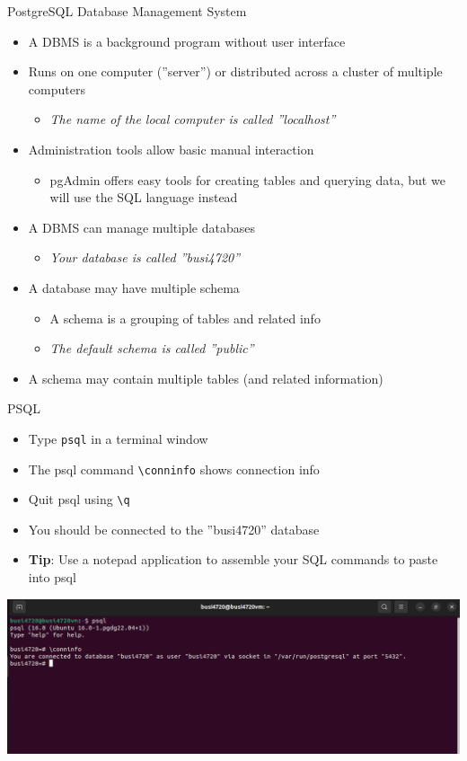 \documentclass[ignorenonframetext,xcolor=x11names]{beamer}
\begin{document}
\begin{frame}{PostgreSQL Database Management System}
\begin{itemize}
  \item A DBMS is a background program without user interface
  \item Runs on one computer (''server'') or distributed across a cluster of multiple computers
  \begin{itemize}
    \item \emph{The name of the local computer is called ''localhost''}
  \end{itemize}
  \item Administration tools allow basic manual interaction
  \begin{itemize}
    \item pgAdmin offers easy tools for creating tables and querying data, but we will use the SQL language instead
  \end{itemize}
  \item A DBMS can manage multiple databases
  \begin{itemize}
    \item \emph{Your database is called ''busi4720''}
  \end{itemize}
  \item A database may have multiple schema
  \begin{itemize}
    \item A schema is a grouping of tables and related info
    \item \emph{The default schema is called ''public''}
  \end{itemize}
  \item A schema may contain multiple tables (and related information)
\end{itemize}
\end{frame}


\begin{frame}{PSQL}
\begin{itemize}
   \item Type \texttt{psql} in a terminal window
   \item The psql command \texttt{\textbackslash conninfo} shows connection info
   \item Quit psql using \texttt{\textbackslash q}
   \item You should be connected to the ''busi4720'' database
   \item \textbf{Tip}: Use a notepad application to assemble your SQL commands to paste into psql
\end{itemize}
\centering
\includegraphics[width=\textwidth]{screen3.png}
\end{frame}
\end{document}
